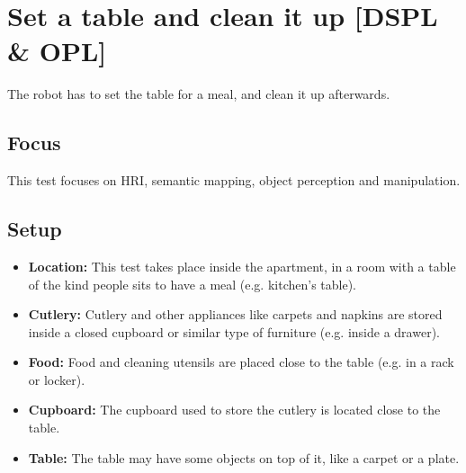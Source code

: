 \section{Set a table and clean it up [DSPL \& OPL]}
The robot has to set the table for a meal, and clean it up afterwards.

\subsection{Focus}
This test focuses on HRI, semantic mapping, object perception and manipulation.

\subsection{Setup}
\begin{itemize}
	\item \textbf{Location:} This test takes place inside the apartment, in a room with a table of the kind people sits to have a meal (e.g. kitchen's table).
	\item \textbf{Cutlery:} Cutlery and other appliances like carpets and napkins are stored inside a closed cupboard or similar type of furniture (e.g. inside a drawer).
	\item \textbf{Food:} Food and cleaning utensils are placed close to the table (e.g. in a rack or locker).
	\item \textbf{Cupboard:} The cupboard used to store the cutlery is located close to the table.
	\item \textbf{Table:} The table may have some objects on top of it, like a carpet or a plate.
\end{itemize}

